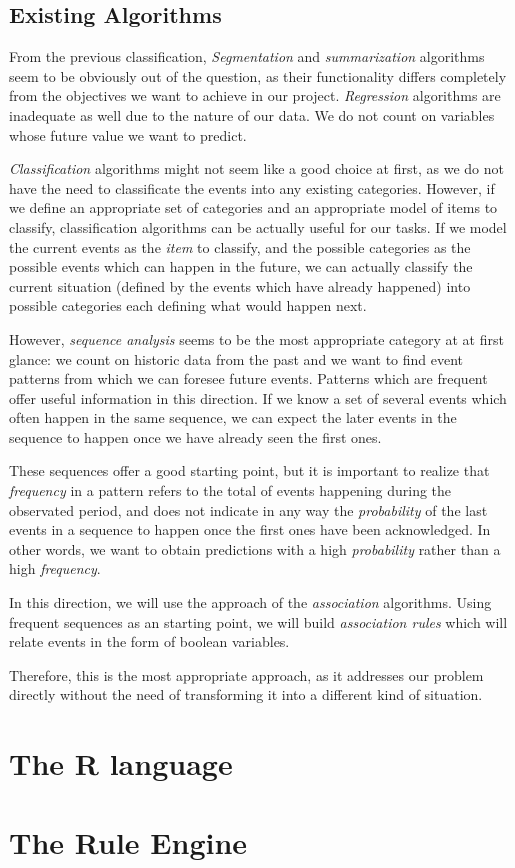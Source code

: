 \subsection{Existing Algorithms}
\label{sec:algorithms}
From the previous classification, \emph{Segmentation} and \emph{summarization} algorithms seem to be obviously out of the question, as their functionality differs completely from the objectives we want to achieve in our project. \emph{Regression} algorithms are inadequate as well due to the nature of our data. We do not count on variables whose future value we want to predict.

\emph{Classification} algorithms might not seem like a good choice at first, as we do not have the need to classificate the events into any existing categories. However, if we define an appropriate set of categories and an appropriate model of items to classify, classification algorithms can be actually useful for our tasks. If we model the current events as the \emph{item} to classify, and the possible categories as the possible events which can happen in the future, we can actually classify the current situation (defined by the events which have already happened) into possible categories each defining what would happen next.

However, \emph{sequence analysis} seems to be the most appropriate category at at first glance: we count on historic data from the past and we want to find event patterns from which we can foresee future events. Patterns which are frequent offer useful information in this direction. If we know a set of several events which often happen in the same sequence, we can expect the later events in the sequence to happen once we have already seen the first ones.

These sequences offer a good starting point, but it is important to realize that \emph{frequency} in a pattern refers to the total of events happening during the observated period, and does not indicate in any way the \emph{probability} of the last events in a sequence to happen once the first ones have been acknowledged. In other words, we want to obtain predictions with a high \emph{probability} rather than a high \emph{frequency}.

In this direction, we will use the approach of the \emph{association} algorithms. Using frequent sequences as an starting point, we will build \emph{association rules} which will relate events in the form of boolean variables.

Therefore, this is the most appropriate approach, as it addresses our problem directly without the need of transforming it into a different kind of situation.

\section{The R language}
\section{The Rule Engine}